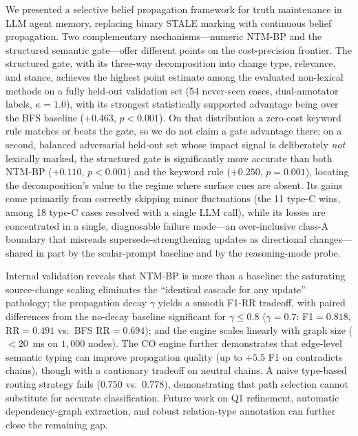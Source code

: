 \documentclass{article}
\theoremstyle{definition}
\begin{document}
We presented a selective belief propagation framework for truth maintenance
in LLM agent memory, replacing binary STALE marking with continuous belief
propagation.  Two complementary mechanisms---numeric NTM-BP and the
structured semantic gate---offer different points on the
cost-precision frontier.  The structured gate, with its three-way
decomposition into change type, relevance, and stance, achieves the
highest point estimate among the evaluated non-lexical methods on a
fully held-out validation set (54 never-seen
cases, dual-annotator labels, $\kappa=1.0$), with its strongest
statistically supported advantage being over the BFS baseline ($+0.463$,
$p<0.001$).  On that distribution a zero-cost keyword rule matches or
beats the gate, so we do not claim a gate advantage there; on a second,
balanced adversarial held-out set whose impact signal is deliberately
\emph{not} lexically marked, the structured gate is significantly more
accurate than both NTM-BP ($+0.110$, $p<0.001$) and the keyword rule
($+0.250$, $p=0.001$), locating the decomposition's value to the
regime where surface cues are absent.  Its gains come primarily from
correctly skipping minor
fluctuations (the 11 type-C wins, among 18 type-C cases resolved with a
single LLM call), while its losses are concentrated in a single,
diagnosable failure mode---an over-inclusive class-A boundary that
misreads supersede-strengthening updates as directional changes---shared
in part by the scalar-prompt baseline and by the reasoning-mode probe.

Internal validation reveals that NTM-BP is more than a baseline:
the saturating source-change scaling eliminates the ``identical cascade
for any update'' pathology; the propagation decay $\gamma$ yields a
smooth F1-RR tradeoff, with paired differences from the no-decay baseline
significant for $\gamma\le0.8$
($\gamma=0.7$: F1$ =0.818$, RR$ =0.491$ vs.\ BFS RR$ =0.694$); and
the engine scales linearly with graph size ($<20$~ms on
$1{,}000$ nodes).  The CO engine further demonstrates that
edge-level semantic typing can improve propagation quality (up to
$+5.5$ F1 on contradicts chains), though with a cautionary tradeoff
on neutral chains.  A naive type-based routing strategy fails
($0.750$ vs.\ $0.778$), demonstrating that path selection cannot
substitute for accurate classification.  Future work on Q1
refinement, automatic dependency-graph extraction, and robust
relation-type annotation can further close the remaining gap.

\end{document}
